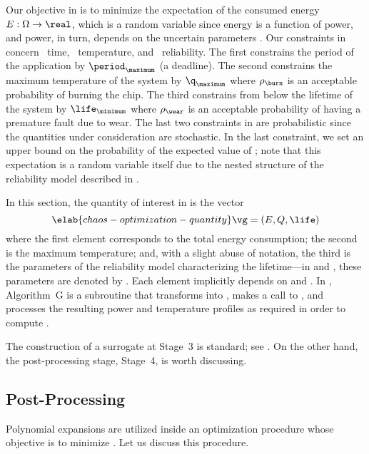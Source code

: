 Our objective in  is to minimize the
expectation of the consumed energy $E: \Omega \to \real$, which is a random
variable since energy is a function of power, and power, in turn, depends on the
uncertain parameters \vu. Our constraints in
 concern \one~time, \two~temperature, and
\three~reliability. The first constrains the period of the application by
$\period_\maximum$ (a deadline). The second constrains the maximum temperature
of the system by $\q_\maximum$ where $\rho_\burn$ is an acceptable probability
of burning the chip. The third constrains from below the lifetime of the system
by $\life_\minimum$ where $\rho_\wear$ is an acceptable probability of having a
premature fault due to wear. The last two constraints in
 are probabilistic since the quantities
under consideration are stochastic. In the last constraint, we set an upper
bound on the probability of the expected value of \life; note that this
expectation is a random variable itself due to the nested structure of the
reliability model described in .

In this section, the quantity of interest \g in  is the
vector
\begin{equation} \elab{chaos-optimization-quantity}
  \vg = (E, Q, \life)
\end{equation}
where the first element corresponds to the total energy consumption; the second
is the maximum temperature; and, with a slight abuse of notation, the third is
the parameters of the reliability model characterizing the lifetime---in
 and , these parameters
are denoted by \vg. Each element implicitly depends on \schedule and \vu. In
, Algorithm~G is a subroutine that transforms \vz into
\vu, makes a call to , and processes
the resulting power and temperature profiles as required in order to compute
\vg.

The construction of a surrogate at Stage~3 is standard; see
. On the other hand, the post-processing stage,
Stage~4, is worth discussing.

\subsection{Post-Processing}

Polynomial expansions are utilized inside an optimization procedure whose
objective is to minimize . Let us discuss
this procedure.

